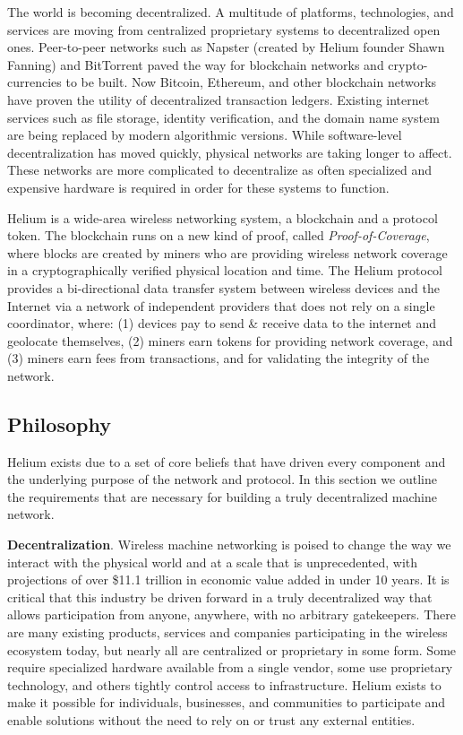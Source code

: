 \documentclass[10pt, nonatbib, nocopyrightspace, reprint]{sigplanconf}
\begin{document}
The world is becoming decentralized. A multitude of platforms, technologies, and services are moving from centralized proprietary systems to decentralized open ones. Peer-to-peer networks such as Napster (created by Helium founder Shawn Fanning) \cite{napster} and BitTorrent paved the way for blockchain networks and crypto-currencies to be built. Now Bitcoin, Ethereum, and other blockchain networks have proven the utility of decentralized transaction ledgers. Existing internet services such as file storage, identity verification, and the domain name system are being replaced by modern algorithmic versions. While software-level decentralization has moved quickly, physical networks are taking longer to affect. These networks are more complicated to decentralize as often specialized and expensive hardware is required in order for these systems to function.

Helium is a wide-area wireless networking system, a blockchain and a protocol token. The blockchain runs on a new kind of proof, called \emph{Proof-of-Coverage}, where blocks are created by miners who are providing wireless network coverage in a cryptographically verified physical location and time. The Helium protocol provides a bi-directional data transfer system between wireless devices and the Internet via a network of independent providers that does not rely on a single coordinator, where: (1) devices pay to send \& receive data to the internet and geolocate themselves, (2) miners earn tokens for providing network coverage, and (3) miners earn fees from transactions, and for validating the integrity of the network.

\subsection{Philosophy}

Helium exists due to a set of core beliefs that have driven every component and the underlying purpose of the network and protocol. In this section we outline the requirements that are necessary for building a truly decentralized machine network.

\textbf{Decentralization}. Wireless machine networking is poised to change the way we interact with the physical world and at a scale that is unprecedented, with projections of over \$11.1 trillion in economic value added in under 10 years\cite{mckinsey}. It is critical that this industry be driven forward in a truly decentralized way that allows participation from anyone, anywhere, with no arbitrary gatekeepers. There are many existing products, services and companies participating in the wireless ecosystem today, but nearly all are centralized or proprietary in some form. Some require specialized hardware available from a single vendor, some use proprietary technology, and others tightly control access to infrastructure. Helium exists to make it possible for individuals, businesses, and communities to participate and enable solutions without the need to rely on or trust any external entities.
\end{document}
